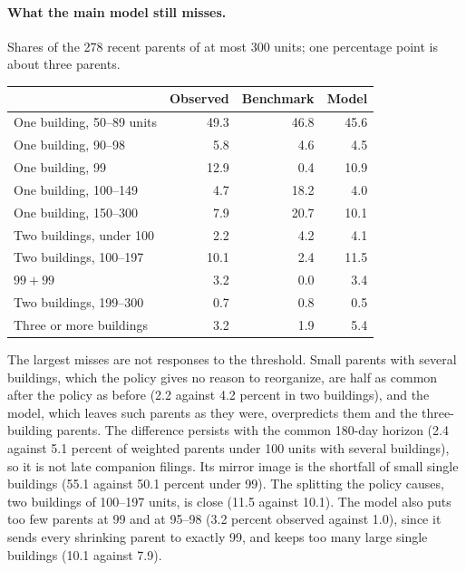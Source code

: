 \paragraph{What the main model still misses.} Shares of the 278 recent parents
of at most 300 units; one percentage point is about three parents.

\begin{center}
\small
\begin{tabular}{lrrr}
\hline
 & Observed & Benchmark & Model \\
\hline
One building, 50--89 units & 49.3 & 46.8 & 45.6 \\
One building, 90--98 & 5.8 & 4.6 & 4.5 \\
One building, 99 & 12.9 & 0.4 & 10.9 \\
One building, 100--149 & 4.7 & 18.2 & 4.0 \\
One building, 150--300 & 7.9 & 20.7 & 10.1 \\
Two buildings, under 100 & 2.2 & 4.2 & 4.1 \\
Two buildings, 100--197 & 10.1 & 2.4 & 11.5 \\
$99+99$ & 3.2 & 0.0 & 3.4 \\
Two buildings, 199--300 & 0.7 & 0.8 & 0.5 \\
Three or more buildings & 3.2 & 1.9 & 5.4 \\
\hline
\end{tabular}
\end{center}

The largest misses are not responses to the threshold. Small parents with
several buildings, which the policy gives no reason to reorganize, are half as
common after the policy as before (2.2 against 4.2 percent in two buildings),
and the model, which leaves such parents as they were, overpredicts them and
the three-building parents. The difference persists with the common 180-day
horizon (2.4 against 5.1 percent of weighted parents under 100 units with
several buildings), so it is not late companion filings. Its mirror image is
the shortfall of small single buildings (55.1 against 50.1 percent under 99).
The splitting the policy causes, two buildings of 100--197 units, is close
(11.5 against 10.1). The model also puts too few parents at 99 and at 95--98
(3.2 percent observed against 1.0), since it sends every shrinking parent to
exactly 99, and keeps too many large single buildings (10.1 against 7.9).

